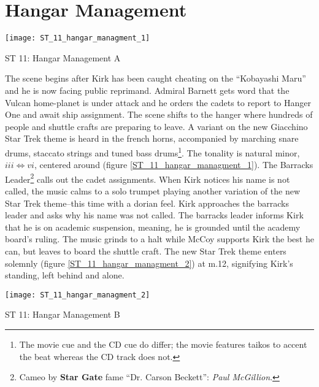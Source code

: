 \section{Hangar Management}
\begin{marginfigure}
\center
\texttt{[image: ST\_11\_hangar\_managment\_1]}
	\caption{ST 11: Hangar Management A}
	\label{ST_11_hangar_managment_1}
\end{marginfigure}
The scene begins after Kirk has been caught cheating on the ``Kobayashi Maru'' and he is now facing public reprimand. Admiral Barnett gets word that the Vulcan home-planet is under attack and he orders the cadets to report to Hanger One and await ship assignment. The scene shifts to the hanger where hundreds of people and shuttle crafts are preparing to leave. A variant on the new Giacchino Star Trek theme is heard in the french horns, accompanied by marching snare drums, staccato strings and tuned bass drums\footnote{The movie cue and the CD cue do differ; the movie features taikos to accent the beat whereas the CD track does not.}. The tonality is natural minor, \({iii}{\Leftrightarrow}{vi}\), centered around \aflat (figure \ref{ST_11_hangar_managment_1}). The Barracks Leader\footnote{Cameo by \textbf{Star Gate} fame ``Dr. Carson Beckett'': \textit{Paul McGillion}.} calls out the cadet assignments. When Kirk notices his name is not called, the music calms to a solo trumpet playing another variation of the new Star Trek theme--this time with a dorian feel. Kirk approaches the barracks leader and asks why his name was not called. The barracks leader informs Kirk that he is on academic suspension, meaning, he is grounded until the academy board's ruling. The music grinds to a halt while McCoy supports Kirk the best he can, but leaves to board the shuttle craft. The new Star Trek theme enters solemnly (figure \ref{ST_11_hangar_managment_2}) at m.12, signifying Kirk's standing, left behind and alone.

\begin{marginfigure}
\center
\texttt{[image: ST\_11\_hangar\_managment\_2]}
	\caption{ST 11: Hangar Management B}
	\label{ST_11_hangar_managment_2}
\end{marginfigure}
 

